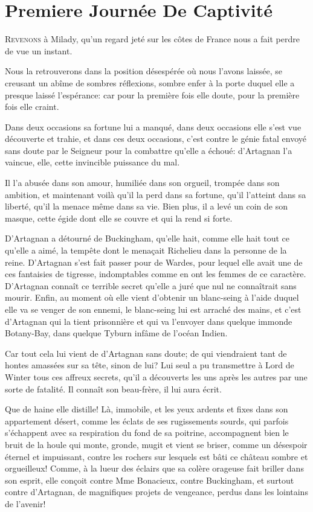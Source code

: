 
\chapter{Premiere Journée De Captivité}

\lettrine{R}{evenons} à Milady, qu'un regard jeté sur les côtes de France nous a fait perdre de vue un instant. 
	
\zz
Nous la retrouverons dans la position désespérée où nous l'avons laissée, se creusant un abîme de sombres réflexions, sombre enfer à la porte duquel elle a presque laissé l'espérance: car pour la première fois elle doute, pour la première fois elle craint. 

Dans deux occasions sa fortune lui a manqué, dans deux occasions elle s'est vue découverte et trahie, et dans ces deux occasions, c'est contre le génie fatal envoyé sans doute par le Seigneur pour la combattre qu'elle a échoué: d'Artagnan l'a vaincue, elle, cette invincible puissance du mal. 

Il l'a abusée dans son amour, humiliée dans son orgueil, trompée dans son ambition, et maintenant voilà qu'il la perd dans sa fortune, qu'il l'atteint dans sa liberté, qu'il la menace même dans sa vie. Bien plus, il a levé un coin de son masque, cette égide dont elle se couvre et qui la rend si forte. 

D'Artagnan a détourné de Buckingham, qu'elle hait, comme elle hait tout ce qu'elle a aimé, la tempête dont le menaçait Richelieu dans la personne de la reine. D'Artagnan s'est fait passer pour de Wardes, pour lequel elle avait une de ces fantaisies de tigresse, indomptables comme en ont les femmes de ce caractère. D'Artagnan connaît ce terrible secret qu'elle a juré que nul ne connaîtrait sans mourir. Enfin, au moment où elle vient d'obtenir un blanc-seing à l'aide duquel elle va se venger de son ennemi, le blanc-seing lui est arraché des mains, et c'est d'Artagnan qui la tient prisonnière et qui va l'envoyer dans quelque immonde Botany-Bay, dans quelque Tyburn infâme de l'océan Indien. 

Car tout cela lui vient de d'Artagnan sans doute; de qui viendraient tant de hontes amassées sur sa tête, sinon de lui? Lui seul a pu transmettre à Lord de Winter tous ces affreux secrets, qu'il a découverts les uns après les autres par une sorte de fatalité. Il connaît son beau-frère, il lui aura écrit. 

Que de haine elle distille! Là, immobile, et les yeux ardents et fixes dans son appartement désert, comme les éclats de ses rugissements sourds, qui parfois s'échappent avec sa respiration du fond de sa poitrine, accompagnent bien le bruit de la houle qui monte, gronde, mugit et vient se briser, comme un désespoir éternel et impuissant, contre les rochers sur lesquels est bâti ce château sombre et orgueilleux! Comme, à la lueur des éclairs que sa colère orageuse fait briller dans son esprit, elle conçoit contre Mme Bonacieux, contre Buckingham, et surtout contre d'Artagnan, de magnifiques projets de vengeance, perdus dans les lointains de l'avenir! 

